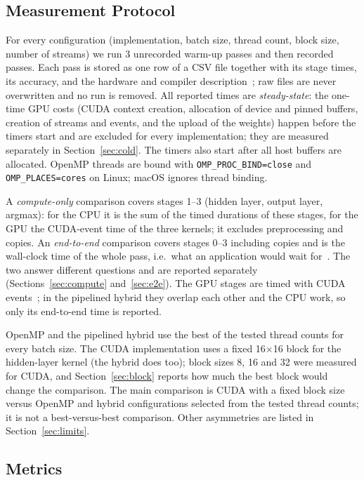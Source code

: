 \subsection{Measurement Protocol}

For every configuration (implementation, batch size, thread count, block size, number of streams) we run 3 unrecorded warm-up passes and then  recorded passes. Each pass is stored as one row of a CSV file together with its stage times, its accuracy, and the hardware and compiler description~\cite{hoefler2015scientific}; raw files are never overwritten and no run is removed. All reported times are \emph{steady-state}: the one-time GPU costs (CUDA context creation, allocation of device and pinned buffers, creation of streams and events, and the upload of the weights) happen before the timers start and are excluded for every implementation; they are measured separately in Section~\ref{sec:cold}. The timers also start after all host buffers are allocated. OpenMP threads are bound with \texttt{OMP\_PROC\_BIND=close} and \texttt{OMP\_PLACES=cores} on Linux; macOS ignores thread binding.

A \emph{compute-only} comparison covers stages 1--3 (hidden layer, output layer, argmax): for the CPU it is the sum of the timed durations of these stages, for the GPU the CUDA-event time of the three kernels; it excludes preprocessing and copies. An \emph{end-to-end} comparison covers stages 0--3 including copies and is the wall-clock time of the whole pass, i.e.\ what an application would wait for~\cite{gregg2011data}. The two answer different questions and are reported separately (Sections~\ref{sec:compute} and~\ref{sec:e2e}). The GPU stages are timed with CUDA events~\cite{harris2012metrics}; in the pipelined hybrid they overlap each other and the CPU work, so only its end-to-end time is reported.

OpenMP and the pipelined hybrid use the best of the tested thread counts for every batch size. The CUDA implementation uses a fixed 16$\times$16 block for the hidden-layer kernel (the hybrid does too); block sizes 8, 16 and 32 were measured for CUDA, and Section~\ref{sec:block} reports how much the best block would change the comparison. The main comparison is CUDA with a fixed block size versus OpenMP and hybrid configurations selected from the tested thread counts; it is not a best-versus-best comparison. Other asymmetries are listed in Section~\ref{sec:limits}.

\subsection{Metrics}

